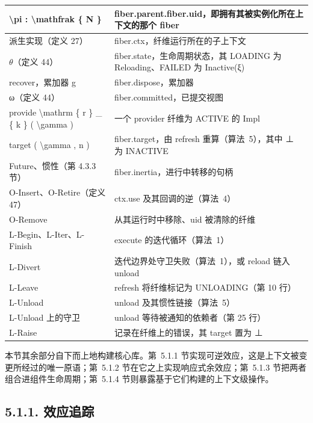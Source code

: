 {\begin{longtable}[]{@{}|l|l|@{}}
\hline
\textbackslash pi : \textbackslash mathfrak \{ N \} & fiber.parent.fiber.uid，即拥有其被实例化所在上下文的那个 fiber \\
\hline
派生实现（定义 27） & fiber.ctx，纤维运行所在的子上下文 \\
\hline
$\theta$（定义 44） & fiber.state，生命周期状态，其 LOADING 为 Reloading、FAILED 为 Inactive(ξ) \\
\hline
recover，累加器 g & fiber.dispose，累加器 \\
\hline
ω（定义 44） & fiber.committed，已提交视图 \\
\hline
provide \textbackslash mathrm \{ r \} \_ \{ k \} ( \textbackslash gamma ) & 一个 provider 纤维为 ACTIVE 的 Impl \\
\hline
target ( \textbackslash gamma , n ) & fiber.target，由 refresh 重算（算法~5），其中 ⊥ 为 INACTIVE \\
\hline
Future、惯性（第 4.3.3 节） & fiber.inertia，进行中转移的句柄 \\
\hline
O-Insert、O-Retire（定义 47） & ctx.use 及其回调的逆（算法~4） \\
\hline
O-Remove & 从其运行时中移除、uid 被清除的纤维 \\
\hline
L-Begin、L-Iter、L-Finish & execute 的迭代循环（算法~1） \\
\hline
L-Divert & 迭代边界处守卫失败（算法~1），或 reload 链入 unload \\
\hline
L-Leave & refresh 将纤维标记为 UNLOADING（第 10 行） \\
\hline
L-Unload & unload 及其惯性链接（算法~5） \\
\hline
L-Unload 上的守卫 & unload 等待被通知的依赖者（第 25 行） \\
\hline
L-Raise & 记录在纤维上的错误，其 target 置为 ⊥ \\
\hline
\end{longtable}
}

本节其余部分自下而上地构建核心库。第~5.1.1 节实现可逆效应，这是上下文被变更所经过的唯一原语；第~5.1.2 节在它之上实现响应式余效应；第~5.1.3 节把两者组合进组件生命周期；第~5.1.4 节则暴露基于它们构建的上下文级操作。

\subsection{5.1.1. 效应追踪}\label{efect-tracking}

